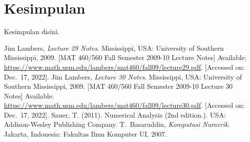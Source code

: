 \documentclass[journal,12pt,onecolumn,a4paper]{IEEEtran}
\begin{document}
\section{Kesimpulan}
Kesimpulan disini.


\begin{thebibliography}{1}
	Jim Lambers, \emph{Lecture 29 Notes}.
	Mississippi, USA: University of Southern Mississippi, 2009. [MAT 460/560 Fall Semester 2009-10 Lecture Notes] Available: \url{https://www.math.usm.edu/lambers/mat460/fall09/lecture29.pdf}. [Accessed on: Dec.~17, 2022].
	Jim Lambers, \emph{Lecture 30 Notes}.
	Mississippi, USA: University of Southern Mississippi, 2009. [MAT 460/560 Fall Semester 2009-10 Lecture 30 Notes] Available: \url{https://www.math.usm.edu/lambers/mat460/fall09/lecture30.pdf}. [Accessed on: Dec.~17, 2022].
	 Sauer, T. (2011). Numerical Analysis (2nd edition.). USA: Addison-Wesley Publishing Company.
	T.~Basaruddin, \emph{Komputasi Numerik}. Jakarta, Indonesia: Fakultas Ilmu Komputer UI, 2007.
\end{thebibliography}
\end{document}
